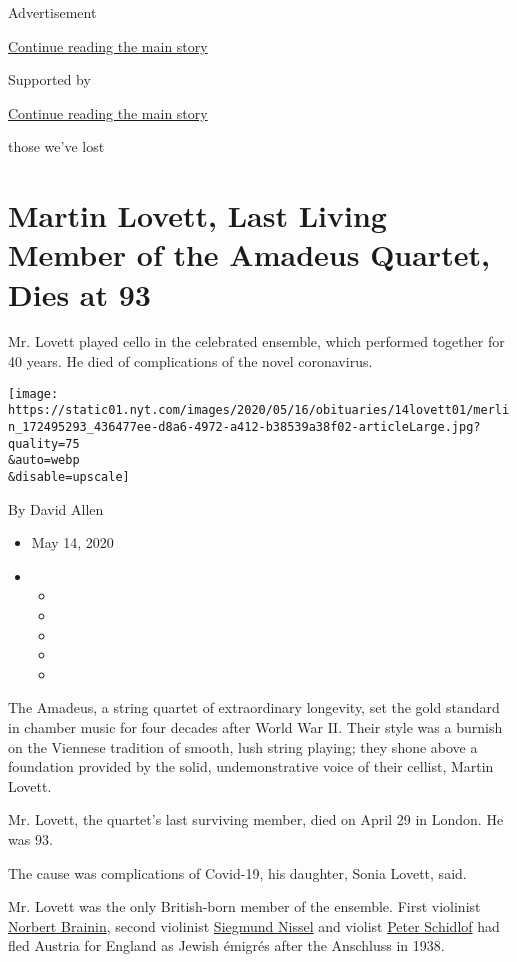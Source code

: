 Advertisement

\protect\hyperlink{after-top}{Continue reading the main story}

Supported by

\protect\hyperlink{after-sponsor}{Continue reading the main story}

those we've lost

\hypertarget{martin-lovett-last-living-member-of-the-amadeus-quartet-dies-at-93}{%
\section{Martin Lovett, Last Living Member of the Amadeus Quartet, Dies
at
93}\label{martin-lovett-last-living-member-of-the-amadeus-quartet-dies-at-93}}

Mr. Lovett played cello in the celebrated ensemble, which performed
together for 40 years. He died of complications of the novel
coronavirus.

\texttt{[image: https://static01.nyt.com/images/2020/05/16/obituaries/14lovett01/merlin\_172495293\_436477ee-d8a6-4972-a412-b38539a38f02-articleLarge.jpg?quality=75\\\&auto=webp\\\&disable=upscale]}

By David Allen

\begin{itemize}
\item
  May 14, 2020
\item
  \begin{itemize}
  \item
  \item
  \item
  \item
  \item
  \end{itemize}
\end{itemize}

The Amadeus, a string quartet of extraordinary longevity, set the gold
standard in chamber music for four decades after World War II. Their
style was a burnish on the Viennese tradition of smooth, lush string
playing; they shone above a foundation provided by the solid,
undemonstrative voice of their cellist, Martin Lovett.

Mr. Lovett, the quartet's last surviving member, died on April 29 in
London. He was 93.

The cause was complications of Covid-19, his daughter, Sonia Lovett,
said.

Mr. Lovett was the only British-born member of the ensemble. First
violinist
\href{https://www.nytimes.com/2005/04/16/arts/music/norbert-brainin-violinist-with-the-amadeus-quartet-dies-at-82.html}{Norbert
Brainin}, second violinist
\href{https://www.nytimes.com/2008/05/24/arts/music/24nissel.html}{Siegmund
Nissel} and violist
\href{https://timesmachine.nytimes.com/timesmachine/1987/08/17/397487.html?pageNumber=24}{Peter
Schidlof} had fled Austria for England as Jewish émigrés after the
Anschluss in 1938.

